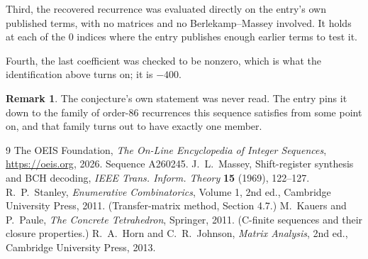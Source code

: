 \documentclass[11pt,a4paper]{article}
\theoremstyle{plain}
\theoremstyle{definition}
\newtheorem{remark}[theorem]{Remark}
\begin{document}
Third, the recovered recurrence was evaluated directly on the entry's own published terms, with
no matrices and no Berlekamp--Massey involved. It holds at each of the $0$ indices where
the entry publishes enough earlier terms to test it.

Fourth, the last coefficient was checked to be nonzero, which is what the identification above
turns on; it is $-400$.

\begin{remark}
The conjecture's own statement was never read. The entry pins it down to the family of
order-$86$ recurrences this sequence satisfies from some point on, and that family turns
out to have exactly one member.
\end{remark}

\begin{thebibliography}{9}
 The OEIS Foundation, \emph{The On-Line Encyclopedia of Integer
Sequences}, \url{https://oeis.org}, 2026. Sequence A260245.
 J.~L.~Massey, Shift-register synthesis and BCH decoding, \emph{IEEE
Trans. Inform. Theory} \textbf{15} (1969), 122--127.
 R.~P.~Stanley, \emph{Enumerative Combinatorics}, Volume 1, 2nd ed.,
Cambridge University Press, 2011. (Transfer-matrix method, Section 4.7.)
 M.~Kauers and P.~Paule, \emph{The Concrete Tetrahedron}, Springer, 2011.
(C-finite sequences and their closure properties.)
 R.~A.~Horn and C.~R.~Johnson, \emph{Matrix Analysis}, 2nd ed., Cambridge
University Press, 2013.
\end{thebibliography}
\end{document}
